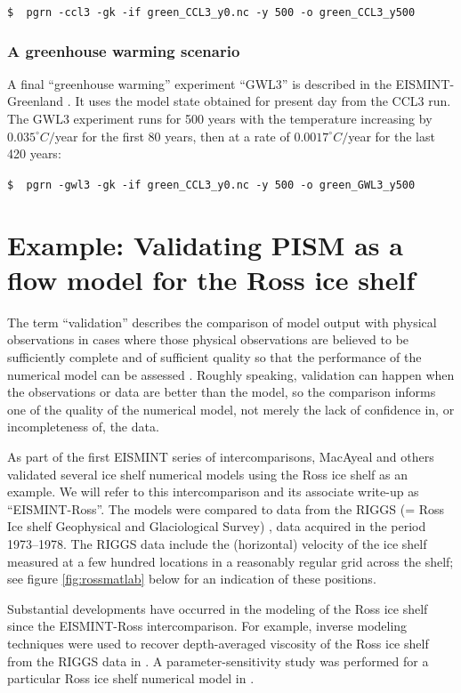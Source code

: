 \documentclass[11pt,final]{amsart}
\begin{document}
\verb|$  pgrn -ccl3 -gk -if green_CCL3_y0.nc -y 500 -o green_CCL3_y500|


\subsubsection*{A greenhouse warming scenario}  A final ``greenhouse warming'' experiment ``GWL3'' is described in the EISMINT-Greenland \cite{RitzEISMINT}.  It uses the model state obtained for present day from the CCL3 run.  The GWL3 experiment  runs for 500 years with the temperature increasing by $0.035^\circ C/$year for the first 80 years, then at a rate of $0.0017^\circ C/$year for the last 420 years:

\verb|$  pgrn -gwl3 -gk -if green_CCL3_y0.nc -y 500 -o green_GWL3_y500|



\clearpage\newpage
\section{Example: Validating PISM as a flow model for the Ross ice shelf}\label{sect:ross}  The term ``validation'' describes the comparison of model output with physical observations in cases where those physical observations are believed to be sufficiently complete and of sufficient quality so that the performance of the numerical model can be assessed \cite{Roache,Wesseling}.  Roughly speaking, validation can happen when the observations or data are better than the model, so the comparison informs one of the quality of the numerical model, not merely the lack of confidence in, or incompleteness of, the data.

As part of the first EISMINT series of intercomparisons, MacAyeal and others \cite{MacAyealetal} validated several ice shelf numerical models using the Ross ice shelf as an example.  We will refer to this intercomparison and its associate write-up \cite{MacAyealetal} as ``EISMINT-Ross''.  The models were compared to data from the RIGGS (= Ross Ice shelf Geophysical and Glaciological Survey) \cite{RIGGS2,RIGGS1}, data acquired in the period 1973--1978.   The RIGGS data include the (horizontal) velocity of the ice shelf measured at a few hundred locations in a reasonably regular grid across the shelf; see figure \ref{fig:rossmatlab} below for an indication of these positions.

Substantial developments have occurred in the modeling of the Ross ice shelf since the EISMINT-Ross intercomparison.  For example, inverse modeling techniques were used to recover depth-averaged viscosity of the Ross ice shelf from the RIGGS data in \cite{RommelaereMacAyeal}. A parameter-sensitivity study was performed for a particular Ross ice shelf numerical model in \cite{HumbertGreveHutter}.
\end{document}

